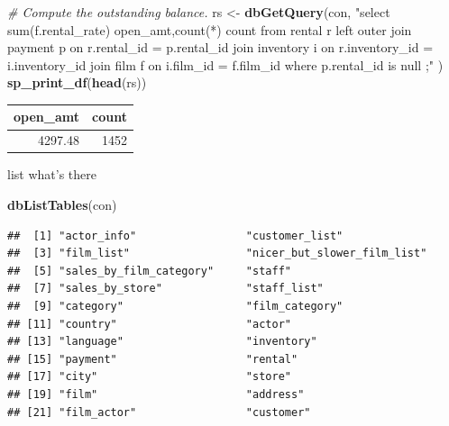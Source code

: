 \documentclass[]{book}
\newenvironment{Shaded}{\begin{snugshade}}{\end{snugshade}}
\newcommand{\CommentTok}[1]{\textcolor[rgb]{0.56,0.35,0.01}{\textit{#1}}}
\newcommand{\KeywordTok}[1]{\textcolor[rgb]{0.13,0.29,0.53}{\textbf{#1}}}
\newcommand{\NormalTok}[1]{#1}
\newcommand{\StringTok}[1]{\textcolor[rgb]{0.31,0.60,0.02}{#1}}
\theoremstyle{definition}
\theoremstyle{definition}
\theoremstyle{definition}
\theoremstyle{remark}
\begin{document}
\begin{Shaded}
\begin{Highlighting}[]
\CommentTok{# Compute the outstanding balance.}
\NormalTok{rs <-}\StringTok{ }\KeywordTok{dbGetQuery}\NormalTok{(con,}
                \StringTok{"select sum(f.rental_rate) open_amt,count(*) count}
\StringTok{                   from rental r }
\StringTok{                        left outer join payment p }
\StringTok{                          on r.rental_id = p.rental_id  }
\StringTok{                        join inventory i}
\StringTok{                          on r.inventory_id = i.inventory_id}
\StringTok{                        join film f}
\StringTok{                          on i.film_id = f.film_id}
\StringTok{                  where p.rental_id is null}
\StringTok{                 ;"}
\NormalTok{                )  }
\KeywordTok{sp_print_df}\NormalTok{(}\KeywordTok{head}\NormalTok{(rs))}
\end{Highlighting}
\end{Shaded}

\begin{tabular}{r|r}
\hline
open\_amt & count\\
\hline
4297.48 & 1452\\
\hline
\end{tabular}

list what's there

\begin{Shaded}
\begin{Highlighting}[]
\KeywordTok{dbListTables}\NormalTok{(con)}
\end{Highlighting}
\end{Shaded}

\begin{verbatim}
##  [1] "actor_info"                 "customer_list"             
##  [3] "film_list"                  "nicer_but_slower_film_list"
##  [5] "sales_by_film_category"     "staff"                     
##  [7] "sales_by_store"             "staff_list"                
##  [9] "category"                   "film_category"             
## [11] "country"                    "actor"                     
## [13] "language"                   "inventory"                 
## [15] "payment"                    "rental"                    
## [17] "city"                       "store"                     
## [19] "film"                       "address"                   
## [21] "film_actor"                 "customer"
\end{verbatim}
\end{document}
